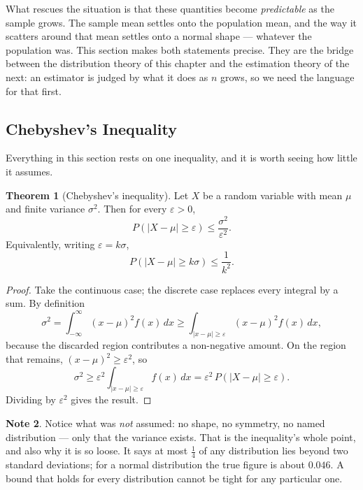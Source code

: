 \documentclass[12pt,a4paper]{report}
\theoremstyle{definition}
\newtheorem{thm}{Theorem}[section]
\newtheorem{note}[thm]{Note}
\theoremstyle{plain}
\begin{document}
What rescues the situation is that these quantities become \emph{predictable} as
the sample grows. The sample mean settles onto the population mean, and the way it
scatters around that mean settles onto a normal shape --- whatever the population
was. This section makes both statements precise. They are the bridge between the
distribution theory of this chapter and the estimation theory of the next: an
estimator is judged by what it does as $n$ grows, so we need the language for
that first.

\subsection{Chebyshev's Inequality}

Everything in this section rests on one inequality, and it is worth seeing how
little it assumes.

\begin{thm}[Chebyshev's inequality]
Let $X$ be a random variable with mean $\mu$ and finite variance $\sigma^2$. Then
for every $\varepsilon>0$,
\[P\left(\left|X-\mu\right|\geq\varepsilon\right)\leq
\frac{\sigma^2}{\varepsilon^2}.\]
Equivalently, writing $\varepsilon=k\sigma$,
\[P\left(\left|X-\mu\right|\geq k\sigma\right)\leq\frac{1}{k^2}.\]
\end{thm}

\begin{proof}
Take the continuous case; the discrete case replaces every integral by a sum.
By definition
\[\sigma^2=\int_{-\infty}^{\infty}(x-\mu)^2f(x)\,dx
\geq\int_{\left|x-\mu\right|\geq\varepsilon}(x-\mu)^2f(x)\,dx,\]
because the discarded region contributes a non-negative amount. On the region that
remains, $(x-\mu)^2\geq\varepsilon^2$, so
\[\sigma^2\geq\varepsilon^2\int_{\left|x-\mu\right|\geq\varepsilon}f(x)\,dx
=\varepsilon^2\,P\left(\left|X-\mu\right|\geq\varepsilon\right).\]
Dividing by $\varepsilon^2$ gives the result.
\end{proof}

\begin{note}
Notice what was \emph{not} assumed: no shape, no symmetry, no named distribution
--- only that the variance exists. That is the inequality's whole point, and also
why it is so loose. It says at most $\frac14$ of any distribution lies beyond two
standard deviations; for a normal distribution the true figure is about $0.046$.
A bound that holds for every distribution cannot be tight for any particular one.
\end{note}
\end{document}
